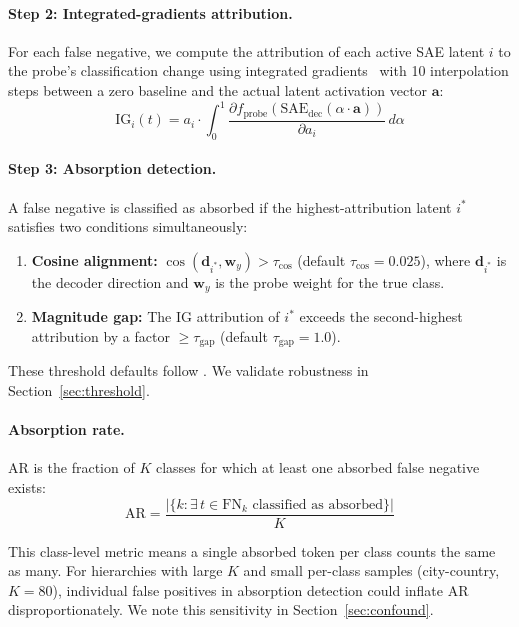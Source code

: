 \documentclass{article}
\begin{document}
\paragraph{Step 2: Integrated-gradients attribution.} For each false negative, we compute the attribution of each active SAE latent $i$ to the probe's classification change using integrated gradients~\citep{sundararajan2017axiomatic} with 10 interpolation steps between a zero baseline and the actual latent activation vector $\mathbf{a}$:
\begin{equation}
\text{IG}_i(t) = a_i \cdot \int_0^1 \frac{\partial f_{\text{probe}}(\text{SAE}_{\text{dec}}(\alpha \cdot \mathbf{a}))}{\partial a_i} \, d\alpha
\end{equation}

\paragraph{Step 3: Absorption detection.} A false negative is classified as absorbed if the highest-attribution latent $i^*$ satisfies two conditions simultaneously:
\begin{enumerate}
\item \textbf{Cosine alignment:} $\cos(\mathbf{d}_{i^*}, \mathbf{w}_y) > \tau_{\cos}$ (default $\tau_{\cos} = 0.025$), where $\mathbf{d}_{i^*}$ is the decoder direction and $\mathbf{w}_y$ is the probe weight for the true class.
\item \textbf{Magnitude gap:} The IG attribution of $i^*$ exceeds the second-highest attribution by a factor $\geq \tau_{\text{gap}}$ (default $\tau_{\text{gap}} = 1.0$).
\end{enumerate}

These threshold defaults follow \citet{chanin2024absorption}. We validate robustness in Section~\ref{sec:threshold}.

\paragraph{Absorption rate.} $\text{AR}$ is the fraction of $K$ classes for which at least one absorbed false negative exists:
\begin{equation}
\text{AR} = \frac{|\{k : \exists\, t \in \text{FN}_k \text{ classified as absorbed}\}|}{K}
\end{equation}

This class-level metric means a single absorbed token per class counts the same as many. For hierarchies with large $K$ and small per-class samples (city-country, $K = 80$), individual false positives in absorption detection could inflate AR disproportionately. We note this sensitivity in Section~\ref{sec:confound}.
\end{document}
